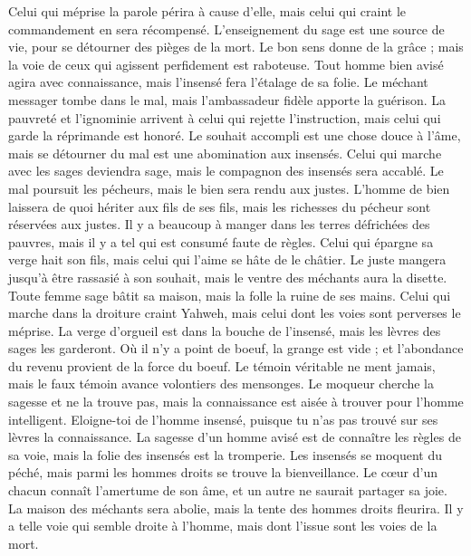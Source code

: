 \begin{multicols}{2}
Celui qui méprise la parole périra à cause d'elle, mais celui qui craint le commandement en sera récompensé.
L'enseignement du sage est une source de vie, pour se détourner des pièges de la mort.
Le bon sens donne de la grâce ; mais la voie de ceux qui agissent perfidement est raboteuse.
Tout homme bien avisé agira avec connaissance, mais l'insensé fera l'étalage de sa folie.
Le méchant messager tombe dans le mal, mais l'ambassadeur fidèle apporte la guérison.
La pauvreté et l'ignominie arrivent à celui qui rejette l'instruction, mais celui qui garde la réprimande est honoré.
Le souhait accompli est une chose douce à l'âme, mais se détourner du mal est une abomination aux insensés.
Celui qui marche avec les sages deviendra sage, mais le compagnon des insensés sera accablé.
Le mal poursuit les pécheurs, mais le bien sera rendu aux justes.
L'homme de bien laissera de quoi hériter aux fils de ses fils, mais les richesses du pécheur sont réservées aux justes.
Il y a beaucoup à manger dans les terres défrichées des pauvres, mais il y a tel qui est consumé faute de règles.
Celui qui épargne sa verge hait son fils, mais celui qui l'aime se hâte de le châtier.
Le juste mangera jusqu'à être rassasié à son souhait, mais le ventre des méchants aura la disette.
\VerseOne{}Toute femme sage bâtit sa maison, mais la folle la ruine de ses mains.
Celui qui marche dans la droiture craint Yahweh, mais celui dont les voies sont perverses le méprise.
La verge d'orgueil est dans la bouche de l'insensé, mais les lèvres des sages les garderont.
Où il n'y a point de boeuf, la grange est vide ; et l'abondance du revenu provient de la force du boeuf.
Le témoin véritable ne ment jamais, mais le faux témoin avance volontiers des mensonges.
Le moqueur cherche la sagesse et ne la trouve pas, mais la connaissance est aisée à trouver pour l'homme intelligent.
Eloigne-toi de l'homme insensé, puisque tu n'as pas trouvé sur ses lèvres la connaissance.
La sagesse d'un homme avisé est de connaître les règles de sa voie, mais la folie des insensés est la tromperie.
Les insensés se moquent du péché, mais parmi les hommes droits se trouve la bienveillance.
Le cœur d'un chacun connaît l'amertume de son âme, et un autre ne saurait partager sa joie.
La maison des méchants sera abolie, mais la tente des hommes droits fleurira.
Il y a telle voie qui semble droite à l'homme, mais dont l'issue sont les voies de la mort.

\end{multicols}
